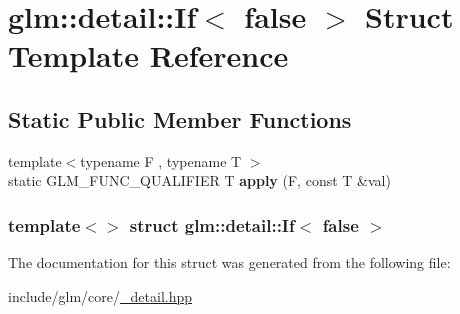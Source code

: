 \hypertarget{structglm_1_1detail_1_1If_3_01false_01_4}{\section{glm\-:\-:detail\-:\-:\-If$<$ false $>$ \-Struct \-Template \-Reference}
\label{structglm_1_1detail_1_1If_3_01false_01_4}
}
\subsection*{\-Static \-Public \-Member \-Functions}
\begin{DoxyCompactItemize}
\item 
\hypertarget{structglm_1_1detail_1_1If_3_01false_01_4_a31a9409e47dc11cb7d4251c12342b9f6}{{\footnotesize template$<$typename F , typename T $>$ }\\static \-G\-L\-M\-\_\-\-F\-U\-N\-C\-\_\-\-Q\-U\-A\-L\-I\-F\-I\-E\-R \-T {\bfseries apply} (\-F, const \-T \&val)}\label{structglm_1_1detail_1_1If_3_01false_01_4_a31a9409e47dc11cb7d4251c12342b9f6}

\end{DoxyCompactItemize}
\subsubsection*{template$<$$>$ struct glm\-::detail\-::\-If$<$ false $>$}



\-The documentation for this struct was generated from the following file\-:\begin{DoxyCompactItemize}
\item 
include/glm/core/\hyperlink{__detail_8hpp}{\-\_\-detail.\-hpp}\end{DoxyCompactItemize}
